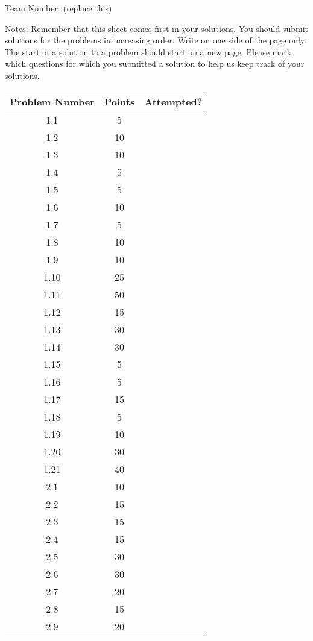\documentclass[12pt]{article}
\newcommand{\TeamNumber}{(replace this)} %
\begin{document}
\thispagestyle{empty}
\noindent \huge{Team Number:} \TeamNumber
\vspace{.5cm}
\normalsize
\begin{paragraph}{Notes:}
Remember that this sheet comes first in your solutions. You should submit solutions for the problems in increasing order. Write on one side of the page only. The start of a solution to a problem should start on a new page. Please mark which questions for which you submitted a solution to help us keep track of your solutions.
\end{paragraph}

\begin{center}
\begin{tabular}{|c|c|c|}\hline
Problem Number & Points & Attempted? \\\hline
1.1 & 5 &  \\\hline
1.2 & 10 &  \\\hline
1.3 & 10 &  \\\hline
1.4 & 5 &  \\\hline
1.5 & 5 &  \\\hline
1.6 & 10 &  \\\hline
1.7 & 5 &  \\\hline
1.8 & 10 &  \\\hline
1.9 & 10 & \\\hline
1.10 & 25 & \\\hline
1.11 & 50 & \\\hline
1.12 & 15 & \\\hline
1.13 & 30 & \\\hline
1.14 & 30 & \\\hline
1.15 & 5 & \\\hline
1.16 & 5 & \\\hline
1.17 & 15 & \\\hline
1.18 & 5 & \\\hline
1.19 & 10 & \\\hline
1.20 & 30 & \\\hline
1.21 & 40 & \\\hline
2.1 & 10 & \\\hline
2.2 & 15 & \\\hline
2.3 & 15 & \\\hline
2.4 & 15 & \\\hline
2.5 & 30 & \\\hline
2.6 & 30 & \\\hline
2.7 & 20 & \\\hline
2.8 & 15 & \\\hline
2.9 & 20 & \\\hline

\end{tabular}
\end{center}
\end{document}
